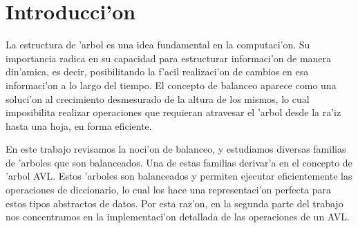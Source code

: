 

\section{Introducci'on}

La estructura de 'arbol es una idea fundamental en la computaci'on. Su importancia radica en su capacidad para estructurar informaci'on de manera din'amica, es decir, posibilitando  la f'acil realizaci'on de cambios en esa informaci'on a lo largo del tiempo. El concepto de balanceo aparece como una soluci'on al crecimiento desmesurado de la altura de los mismos, lo cual imposibilita realizar operaciones que requieran atravesar el 'arbol desde la ra'iz hasta una hoja, en forma eficiente.

En este trabajo revisamos la noci'on de balanceo, y estudiamos diversas familias de 'arboles que son balanceados. Una de estas familias derivar'a en el concepto de 'arbol AVL. Estos 'arboles son balanceados y permiten ejecutar eficientemente las operaciones de diccionario, lo cual los hace una representaci'on perfecta para estos tipos abstractos de datos. Por esta raz'on, en la segunda parte del trabajo nos concentramos en la implementaci'on detallada de las operaciones de un AVL.